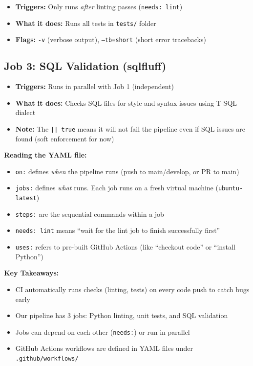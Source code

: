 \documentclass[12pt, a4paper, oneside]{report}
\begin{document}
\begin{itemize}
    \item \textbf{Triggers:} Only runs \textit{after} linting passes (\texttt{needs: lint})
    \item \textbf{What it does:} Runs all tests in \texttt{tests/} folder
    \item \textbf{Flags:} \texttt{-v} (verbose output), \texttt{--tb=short} (short error tracebacks)
\end{itemize}

\subsection{Job 3: SQL Validation (sqlfluff)}

\begin{itemize}
    \item \textbf{Triggers:} Runs in parallel with Job 1 (independent)
    \item \textbf{What it does:} Checks SQL files for style and syntax issues using T-SQL dialect
    \item \textbf{Note:} The \texttt{|| true} means it will not fail the pipeline even if SQL issues are found (soft enforcement for now)
\end{itemize}

\begin{notebox}
    \textbf{Reading the YAML file:}
    \begin{itemize}
        \item \texttt{on:} defines \textit{when} the pipeline runs (push to main/develop, or PR to main)
        \item \texttt{jobs:} defines \textit{what} runs. Each job runs on a fresh virtual machine (\texttt{ubuntu-latest})
        \item \texttt{steps:} are the sequential commands within a job
        \item \texttt{needs: lint} means ``wait for the lint job to finish successfully first''
        \item \texttt{uses:} refers to pre-built GitHub Actions (like ``checkout code'' or ``install Python'')
    \end{itemize}
\end{notebox}

\begin{summarybox}
\textbf{Key Takeaways:}
\begin{itemize}
    \item CI automatically runs checks (linting, tests) on every code push to catch bugs early
    \item Our pipeline has 3 jobs: Python linting, unit tests, and SQL validation
    \item Jobs can depend on each other (\texttt{needs:}) or run in parallel
    \item GitHub Actions workflows are defined in YAML files under \texttt{.github/workflows/}
\end{itemize}
\end{summarybox}
\end{document}
